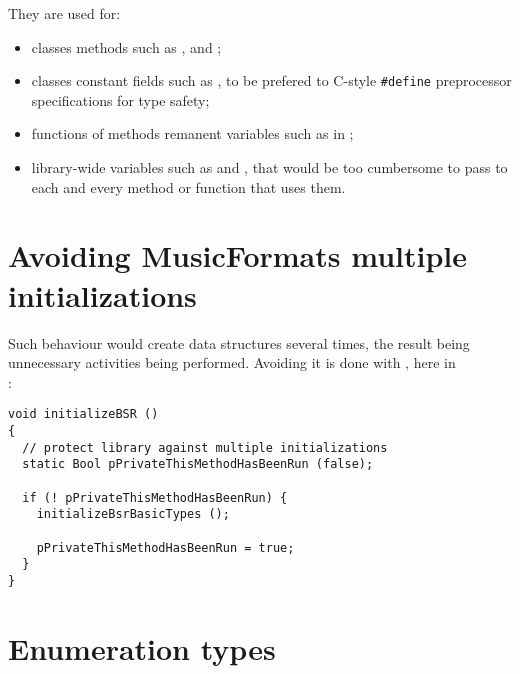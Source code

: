 They are used for:
\begin{itemize}
\item classes methods such as ,  and ;

\item classes constant fields such as , to be prefered to C-style {\tt \#define} preprocessor specifications for type safety;

\item functions of methods remanent variables such as  in ;

\item library-wide variables such as  and , that would be too cumbersome to pass to each and every method or function that uses them.
\end{itemize}


\section{Avoiding MusicFormats multiple initializations}

Such behaviour would create data structures several times, the result being unnecessary activities being performed. Avoiding it is done with , here in \\
:
\begin{lstlisting}[language=CPlusPlus]
void initializeBSR ()
{
  // protect library against multiple initializations
  static Bool pPrivateThisMethodHasBeenRun (false);

  if (! pPrivateThisMethodHasBeenRun) {
    initializeBsrBasicTypes ();

    pPrivateThisMethodHasBeenRun = true;
  }
}
\end{lstlisting}


\section{Enumeration types}

